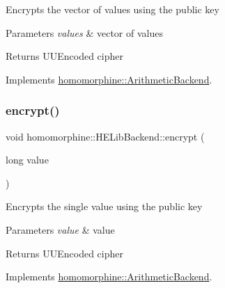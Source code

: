 Encrypts the vector of values using the public key


\begin{DoxyParams}{Parameters}
{\em values} & vector of values \\
\hline
\end{DoxyParams}
\begin{DoxyReturn}{Returns}
U\+U\+Encoded cipher 
\end{DoxyReturn}


Implements \hyperlink{classhomomorphine_1_1_arithmetic_backend_a684c16673191eb5f7c6400f3d34cbcc1}{homomorphine\+::\+Arithmetic\+Backend}.

\mbox{\label{classhomomorphine_1_1_h_e_lib_backend_a0fc8b8ad698a9816dde898087b6b5c57}} 
\subsubsection{\texorpdfstring{encrypt()}{encrypt()}\hspace{0.1cm}{\footnotesize\ttfamily [2/2]}}
{\footnotesize\ttfamily void homomorphine\+::\+H\+E\+Lib\+Backend\+::encrypt (\begin{DoxyParamCaption}\item[{long}]{value }\end{DoxyParamCaption})\hspace{0.3cm}{\ttfamily [virtual]}}

Encrypts the single value using the public key


\begin{DoxyParams}{Parameters}
{\em value} & value \\
\hline
\end{DoxyParams}
\begin{DoxyReturn}{Returns}
U\+U\+Encoded cipher 
\end{DoxyReturn}


Implements \hyperlink{classhomomorphine_1_1_arithmetic_backend_abdf6100f3d87580c942526027823fdb1}{homomorphine\+::\+Arithmetic\+Backend}.

\mbox{\label{classhomomorphine_1_1_h_e_lib_backend_a2c6ed82eeb597b99ae6cdb2734412a0f}} 
